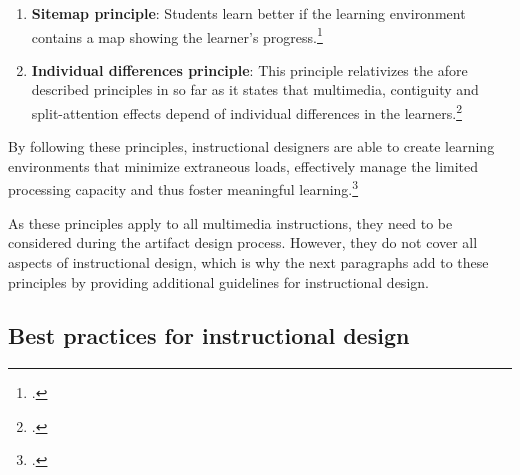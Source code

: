 \begin{enumerate}
    \begin{enumerate}
        \item \textbf{Guided activity:} A pedagogical agent who helps guide students' cognitive processing is helpful for meaningful learning.
        \item \textbf{Reflection}: By asking students to reflect upon answers, the process of sense making is facilitated.
        \item \textbf{Feedback}: Students learn better with explanatory rather than corrective feedback.
        \item \textbf{Pacing}: If allowed to control the pace of presentation of the learning material, students are allowed to adapt the presentation to their processing rate, thus facilitating learning.\footcites[Cf.][p.316]{MorenoInteractiveMultimodalLearning2007}
    \end{enumerate}
    \item \textbf{Sitemap principle}: Students learn better if the learning environment contains a map showing the learner's progress.\footcites[Cf.][p.7]{MayerMultimediaLearning2009}
    \item \textbf{Individual differences principle}: This principle relativizes the afore described principles in so far as it states that multimedia, contiguity and split-attention effects depend of individual differences in the learners.\footcites[Cf.][p.15]{MayerCognitiveTheoryMultimedia1999}
\end{enumerate}
By following these principles, instructional designers are able to create learning environments that minimize extraneous loads, effectively manage the limited processing capacity and thus foster meaningful learning.\footcites[Cf.][chapter 2, paragraph 6]{ClarkElearningscienceinstruction2016}

As these principles apply to all multimedia instructions, they need to be considered during the artifact design process. However, they do not cover all aspects of instructional design, which is why the next paragraphs add to these principles by providing additional guidelines for instructional design.

\subsection{Best practices for instructional design}

